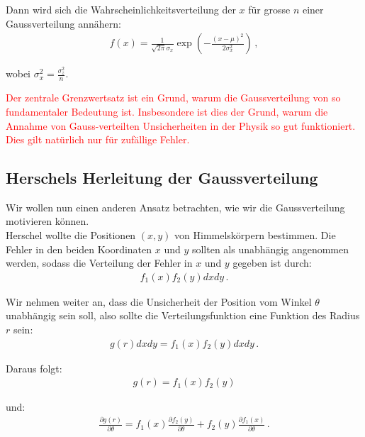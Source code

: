 Dann wird sich die Wahrscheinlichkeitsverteilung der $x$ für grosse $n$ einer Gaussverteilung annähern:
\begin{align}
f(x) = \frac{ 1 }{ \sqrt{ 2 \pi } \sigma_x } \exp \left( - \frac{ (x - \mu)^2 }{ 2 \sigma_x^2 } \right)\,,
\label{eq:vl5-31}
\end{align}

wobei $\sigma_x^2 = \frac{ \sigma_z^2 }{ n }$.

\begin{center}
\textcolor{red}{Der zentrale Grenzwertsatz ist ein Grund, warum die Gaussverteilung von so fundamentaler Bedeutung ist. Insbesondere ist dies der Grund, warum die Annahme von Gauss-verteilten Unsicherheiten in der Physik so gut funktioniert. Dies gilt natürlich nur für zufällige Fehler.}
\end{center}


\subsection{Herschels Herleitung der Gaussverteilung}
\label{subsec:vl5-5}

Wir wollen nun einen anderen Ansatz betrachten, wie wir die Gaussverteilung motivieren können.\\[0.3cm]
Herschel wollte die Positionen $(x, y)$ von Himmelskörpern bestimmen. Die Fehler in den beiden Koordinaten $x$ und $y$ sollten als unabhängig angenommen werden, sodass die Verteilung der Fehler in $x$ und $y$ gegeben ist durch:
\begin{align}
f_1(x)f_2(y)dxdy \,.
\label{eq:vl5-32}
\end{align}

Wir nehmen weiter an, dass die Unsicherheit der Position vom Winkel $\theta$ unabhängig sein soll, also sollte die Verteilungsfunktion eine Funktion des Radius $r$ sein:
\begin{align}
g(r)dxdy = f_1(x)f_2(y)dxdy \,.
\label{eq:vl5-33}
\end{align}

Daraus folgt:
\begin{align}
g(r) = f_1(x)f_2(y)
\label{eq:vl5-34}
\end{align}

und:
\begin{align}
\frac{ \partial g(r) }{ \partial \theta } = f_1(x) \frac{ \partial f_2(y) }{ \partial \theta } + f_2(y) \frac{ \partial f_1(x) }{ \partial \theta } \,.
\label{eq:vl5-35}
\end{align}

